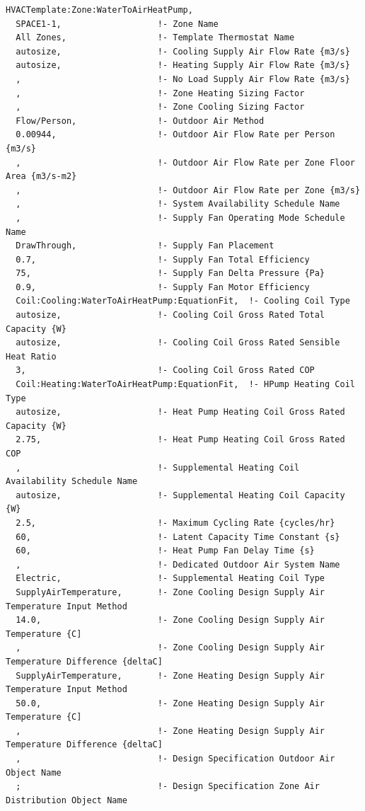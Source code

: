\begin{lstlisting}
HVACTemplate:Zone:WaterToAirHeatPump,
  SPACE1-1,                   !- Zone Name
  All Zones,                  !- Template Thermostat Name
  autosize,                   !- Cooling Supply Air Flow Rate {m3/s}
  autosize,                   !- Heating Supply Air Flow Rate {m3/s}
  ,                           !- No Load Supply Air Flow Rate {m3/s}
  ,                           !- Zone Heating Sizing Factor
  ,                           !- Zone Cooling Sizing Factor
  Flow/Person,                !- Outdoor Air Method
  0.00944,                    !- Outdoor Air Flow Rate per Person {m3/s}
  ,                           !- Outdoor Air Flow Rate per Zone Floor Area {m3/s-m2}
  ,                           !- Outdoor Air Flow Rate per Zone {m3/s}
  ,                           !- System Availability Schedule Name
  ,                           !- Supply Fan Operating Mode Schedule Name
  DrawThrough,                !- Supply Fan Placement
  0.7,                        !- Supply Fan Total Efficiency
  75,                         !- Supply Fan Delta Pressure {Pa}
  0.9,                        !- Supply Fan Motor Efficiency
  Coil:Cooling:WaterToAirHeatPump:EquationFit,  !- Cooling Coil Type
  autosize,                   !- Cooling Coil Gross Rated Total Capacity {W}
  autosize,                   !- Cooling Coil Gross Rated Sensible Heat Ratio
  3,                          !- Cooling Coil Gross Rated COP
  Coil:Heating:WaterToAirHeatPump:EquationFit,  !- HPump Heating Coil Type
  autosize,                   !- Heat Pump Heating Coil Gross Rated Capacity {W}
  2.75,                       !- Heat Pump Heating Coil Gross Rated COP
  ,                           !- Supplemental Heating Coil Availability Schedule Name
  autosize,                   !- Supplemental Heating Coil Capacity {W}
  2.5,                        !- Maximum Cycling Rate {cycles/hr}
  60,                         !- Latent Capacity Time Constant {s}
  60,                         !- Heat Pump Fan Delay Time {s}
  ,                           !- Dedicated Outdoor Air System Name
  Electric,                   !- Supplemental Heating Coil Type
  SupplyAirTemperature,       !- Zone Cooling Design Supply Air Temperature Input Method
  14.0,                       !- Zone Cooling Design Supply Air Temperature {C]
  ,                           !- Zone Cooling Design Supply Air Temperature Difference {deltaC]
  SupplyAirTemperature,       !- Zone Heating Design Supply Air Temperature Input Method
  50.0,                       !- Zone Heating Design Supply Air Temperature {C]
  ,                           !- Zone Heating Design Supply Air Temperature Difference {deltaC]
  ,                           !- Design Specification Outdoor Air Object Name
  ;                           !- Design Specification Zone Air Distribution Object Name
\end{lstlisting}


